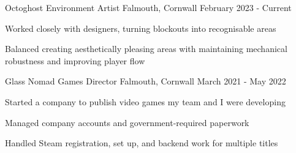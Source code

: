 

\begin{cventries}
    \cventry
        {Octoghost}
        {Environment Artist}
        {Falmouth, Cornwall}
        {February 2023 - Current}
        {
            \begin{cvitems}
                \item Worked closely with designers, turning blockouts into recognisable areas
                \item Balanced creating aesthetically pleasing areas with maintaining mechanical robustness and improving player flow
            \end{cvitems}
        }

    \cventry
        {Glass Nomad Games}
        {Director}
        {Falmouth, Cornwall}
        {March 2021 - May 2022}
        {
            \begin{cvitems}
                \item Started a company to publish video games my team and I were developing
                \item Managed company accounts and government-required paperwork
                \item Handled Steam registration, set up, and backend work for multiple titles
            \end{cvitems}
        }




\end{cventries}
